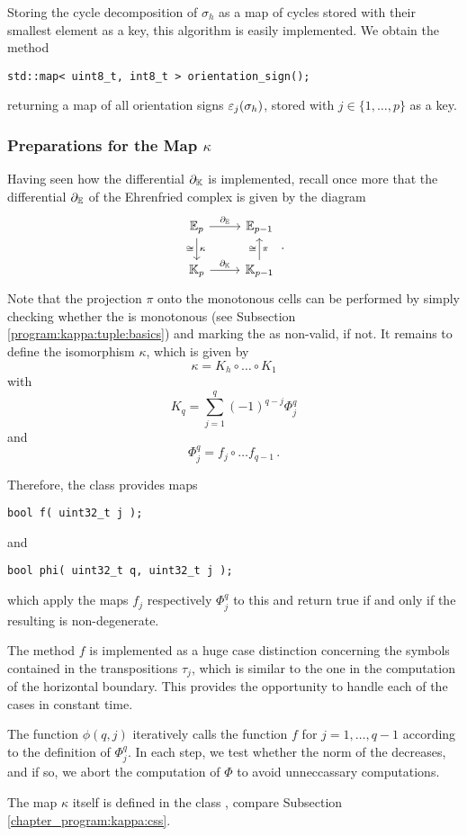 Storing the cycle decomposition of $\sigma_h$ as a map of cycles stored with their smallest element as a key,
this algorithm is easily implemented.
We obtain the method
\begin{lstlisting}
std::map< uint8_t, int8_t > orientation_sign();
\end{lstlisting}
returning a map of all orientation signs $\varepsilon_j(\sigma_h)$, stored with $j \in \{1, \dotsc, p\}$ as a key.

\subsubsection{Preparations for the Map \texorpdfstring{$\kappa$}{kappa}}
\label{program:kappa:tuple:prep_for_kappa}

Having seen how the differential $\partial_\mathbb K$ is implemented, 
recall once more that the differential $\partial_\mathbb E$ of the Ehrenfried complex is given by the diagram
\[
    \begin{tikzcd}
	\E_p \arrow{r}{\del_\E} \arrow{d}{\kappa}[swap]{\cong}      & \E_{p-1} \\
	\KK_p \arrow{r}{\del_\KK}                                     & \KK_{p-1} \arrow{u}{\cong}[swap]{\pi}
    \end{tikzcd}\,.
\]
Note that the projection $\pi$ onto the monotonous cells can be performed by 
simply checking whether the  is monotonous (see Subsection \ref{program:kappa:tuple:basics})
and marking the  as non-valid, if not.
It remains to define the isomorphism $\kappa$, which is given by
\[
    \kappa = K_h \circ \ldots \circ K_1
\]
with
\[
    K_q = \sum_{j=1}^q (-1)^{q-j} \Phi_{j}^q
\]
and
\[
    \Phi_j^q = f_j \circ \ldots f_{q-1} \,.
\]

Therefore, the class  provides maps
\begin{lstlisting}
bool f( uint32_t j );
\end{lstlisting}
and 
\begin{lstlisting}
bool phi( uint32_t q, uint32_t j );
\end{lstlisting}
which apply the maps $f_j$ respectively $\Phi_j^q$ to this  
and return true if and only if the resulting  is non-degenerate. 

The method $f$ is implemented as a huge case distinction 
concerning the symbols contained in the transpositions $\tau_j$,
which is similar to the one in the computation of the horizontal boundary. 
This provides the opportunity to handle each of the cases in constant time.

The function $\phi(q, j)$ iteratively calls the function $f$ for $j = 1, \dotsc, q-1$
according to the definition of $\Phi_j^q$.
In each step, we test whether the norm of the  decreases, and if so, 
we abort the computation of $\Phi$ to avoid unneccassary computations.

The map $\kappa$ itself is defined in the class , compare Subsection \ref{chapter_program:kappa:css}.